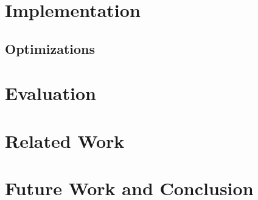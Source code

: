 \documentclass[12pt]{article}
\begin{document}
   
\section*{Implementation}

   \subsection*{Optimizations}


\section*{Evaluation}


\section*{Related Work}


\section*{Future Work and Conclusion}




\end{document}
